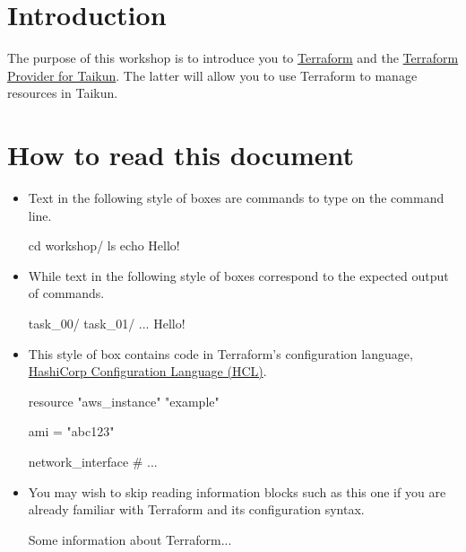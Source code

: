 \section{Introduction}
The purpose of this workshop is to introduce you to
\href{https://www.terraform.io/intro/index.html}{Terraform}
and the \href{https://github.com/itera-io/terraform-provider-taikun}{Terraform Provider for Taikun}.
The latter will allow you to use Terraform to manage resources in Taikun.

\section{How to read this document}

\begin{itemize}
  \item Text in the following style of boxes are commands to type on the command line.
\begin{shell}
cd workshop/
ls
echo Hello!
\end{shell}
\item While text in the following style of boxes correspond to the expected output of commands.
\begin{raw}
task_00/
task_01/
...
Hello!
\end{raw}
\item This style of box contains code in Terraform's configuration language,
\href{https://www.terraform.io/docs/language/syntax/configuration.html}{HashiCorp Configuration Language (HCL)}.
\begin{tf}
resource "aws_instance" "example" {
  ami = "abc123"

  network_interface {
    # ...
  }
}
\end{tf}
\item You may wish to skip reading information blocks such as this one if you are already familiar with
Terraform and its configuration syntax.
\begin{tip}
  Some information about Terraform...
\end{tip}
\end{itemize}
